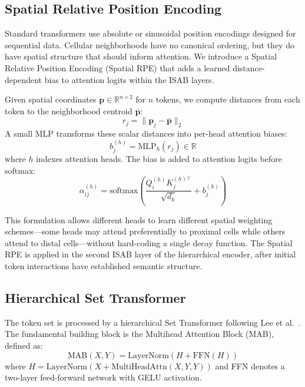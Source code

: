 \documentclass[conference]{IEEEtran}
\begin{document}
\subsection{Spatial Relative Position Encoding}

Standard transformers use absolute or sinusoidal position encodings designed for sequential data. Cellular neighborhoods have no canonical ordering, but they do have spatial structure that should inform attention. We introduce a Spatial Relative Position Encoding (Spatial RPE) that adds a learned distance-dependent bias to attention logits within the ISAB layers.

Given spatial coordinates $\mathbf{p} \in \mathbb{R}^{n \times 2}$ for $n$ tokens, we compute distances from each token to the neighborhood centroid $\bar{\mathbf{p}}$:
\begin{equation}
r_j = \|\mathbf{p}_j - \bar{\mathbf{p}}\|_2
\label{eq:rpe_dist}
\end{equation}
A small MLP transforms these scalar distances into per-head attention biases:
\begin{equation}
b_j^{(h)} = \text{MLP}_h(r_j) \in \mathbb{R}
\label{eq:rpe_bias}
\end{equation}
where $h$ indexes attention heads. The bias is added to attention logits before softmax:
\begin{equation}
\alpha_{ij}^{(h)} = \text{softmax}\left(\frac{Q_i^{(h)} K_j^{(h)\top}}{\sqrt{d_k}} + b_j^{(h)}\right)
\label{eq:rpe_attn}
\end{equation}

This formulation allows different heads to learn different spatial weighting schemes---some heads may attend preferentially to proximal cells while others attend to distal cells---without hard-coding a single decay function. The Spatial RPE is applied in the second ISAB layer of the hierarchical encoder, after initial token interactions have established semantic structure.

\subsection{Hierarchical Set Transformer}

The token set is processed by a hierarchical Set Transformer following Lee et al.\ \cite{Lee2018-ya}. The fundamental building block is the Multihead Attention Block (MAB), defined as:
\begin{equation}
\text{MAB}(X, Y) = \text{LayerNorm}(H + \text{FFN}(H))
\label{eq:mab}
\end{equation}
where $H = \text{LayerNorm}(X + \text{MultiHeadAttn}(X, Y, Y))$ and FFN denotes a two-layer feed-forward network with GELU activation.
\end{document}
